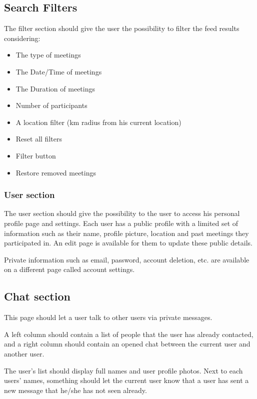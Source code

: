 \documentclass[conference]{IEEEtran}
\begin{document}
\subsection{Search Filters}

The filter section should give the user the possibility to filter the feed results considering:

\begin{itemize}
\item The type of meetings
\item The Date/Time of meetings
\item The Duration of meetings
\item Number of participants
\item A location filter (km radius from his current
location)
\item Reset all filters
\item Filter button
\item Restore removed meetings
\end{itemize}

\subsubsection{User section}

The user section should give the possibility to the user to
access his personal profile page and settings. Each user has a public profile with a limited set of information such as their name, profile picture, location and past meetings they participated in. An edit page is available for them to update these public details.

Private information such as email, password, account deletion, etc. are available on a different page called account settings.

\subsection{Chat section}

This page should let a user talk to other users via private
messages.

A left column should contain a list of people that the user
has already contacted, and a right column should contain an opened chat between the current user and another user.

The user’s list should display full names and user profile photos. Next to each users' names, something should let the current user know that a user has sent a new message that he/she has not seen already.
\end{document}
